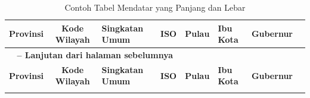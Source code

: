 \begin{landscape}
\begin{longtable}{p{3.5cm}cllllll}
\caption{Contoh Tabel Mendatar yang Panjang dan Lebar}\\
\hline
\textbf{Provinsi} & \textbf{Kode Wilayah} & \textbf{Singkatan Umum} & \textbf{ISO} & \textbf{Pulau} & \textbf{Ibu Kota} & \textbf{Gubernur} \\ \hline
\endfirsthead

\multicolumn{4}{l}{\bfseries \tablename\ \thetable{} -- Lanjutan dari halaman sebelumnya}\\
\hline
\textbf{Provinsi} & \textbf{Kode Wilayah} & \textbf{Singkatan Umum} & \textbf{ISO} & \textbf{Pulau} & \textbf{Ibu Kota} & \textbf{Gubernur} \\ \hline

\endhead

\hline
\endfoot

\endlastfoot




\end{longtable}
\end{landscape}
